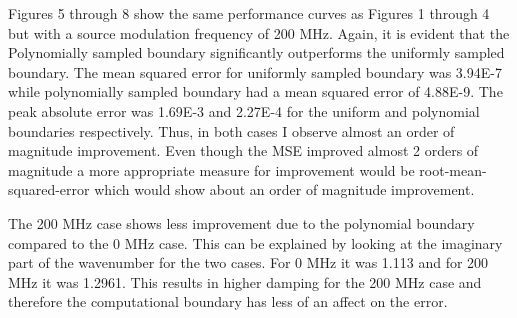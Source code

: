 \documentclass [11 pt, titlepage]{article}
\begin{document}
Figures 5 through 8 show the same performance curves as Figures 1
through 4 but with a source modulation frequency of 200 MHz.  Again,
it is evident that the Polynomially sampled boundary significantly
outperforms the uniformly sampled boundary.  The mean squared error
for uniformly sampled boundary was 3.94E-7 while polynomially sampled
boundary had a mean squared error of 4.88E-9.   The peak absolute
error was 1.69E-3 and 2.27E-4 for the uniform and polynomial
boundaries respectively.  Thus, in both cases I observe almost an
order of magnitude improvement.  Even though the MSE improved almost 2
orders of magnitude a more appropriate measure for improvement would
be root-mean-squared-error which would show about an order of
magnitude improvement.

The 200 MHz case shows less improvement due to the polynomial boundary
compared to the 0 MHz case.  This can be explained by looking at the
imaginary part of the wavenumber for the two cases.  For 0 MHz it was
1.113 and for 200 MHz it was 1.2961.  This results in higher damping
for the 200 MHz case and therefore the computational boundary has less
of an affect on the error.
\end{document}
